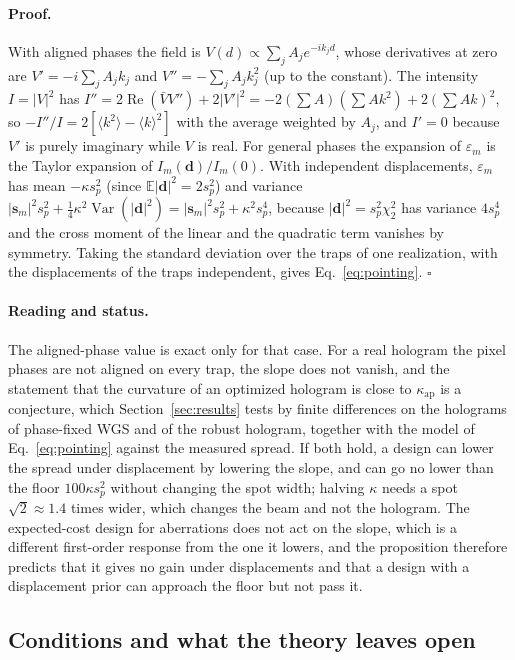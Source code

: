 \paragraph{Proof.} With aligned phases the field is $V(d)\propto\sum_jA_je^{-ik_jd}$, whose derivatives at zero are $V'=-i\sum_jA_jk_j$ and $V''=-\sum_jA_jk_j^2$ (up to the constant). The intensity $I=|V|^2$ has $I''=2\operatorname{Re}(\bar VV'')+2|V'|^2=-2(\sum A)(\sum Ak^2)+2(\sum Ak)^2$, so $-I''/I=2[\langle k^2\rangle-\langle k\rangle^2]$ with the average weighted by $A_j$, and
$I'=0$ because $V'$ is purely imaginary while $V$ is real. For general phases the expansion of $\varepsilon_m$ is the Taylor expansion of $I_m(\mathbf d)/I_m(0)$. With independent displacements, $\varepsilon_m$ has mean $-\kappa s_p^2$ (since $\mathbb E|\mathbf d|^2=2s_p^2$) and variance $|\mathbf s_m|^2s_p^2+\tfrac14\kappa^2\operatorname{Var}(|\mathbf d|^2)=|\mathbf s_m|^2s_p^2+\kappa^2s_p^4$, because
$|\mathbf d|^2=s_p^2\chi_2^2$ has variance $4s_p^4$ and the cross moment of the linear and the quadratic term vanishes by symmetry. Taking the standard deviation over the traps of one realization, with the displacements of the traps independent, gives Eq.~\eqref{eq:pointing}. \hfill$\square$

\paragraph{Reading and status.} The aligned-phase value is exact only for that case. For a real hologram the pixel phases are not aligned on every trap, the slope does not vanish, and the statement that the curvature of an optimized hologram is close to $\kappa_{\mathrm{ap}}$ is a conjecture, which Section~\ref{sec:results} tests by finite differences on the holograms of phase-fixed WGS and of the robust hologram, together with the model of Eq.~\eqref{eq:pointing} against the measured spread.
If both hold, a design can lower the spread under displacement by lowering the slope, and can go no lower than the floor $100\kappa s_p^2$ without changing the spot width; halving $\kappa$ needs a spot $\sqrt2\approx1.4$ times wider, which changes the beam and not the hologram. The expected-cost design for aberrations does not act on the slope, which is a different first-order response from the one it lowers, and the proposition therefore predicts that it gives no gain under displacements and
that a design with a displacement prior can approach the floor but not pass it.

\subsection{Conditions and what the theory leaves open}


